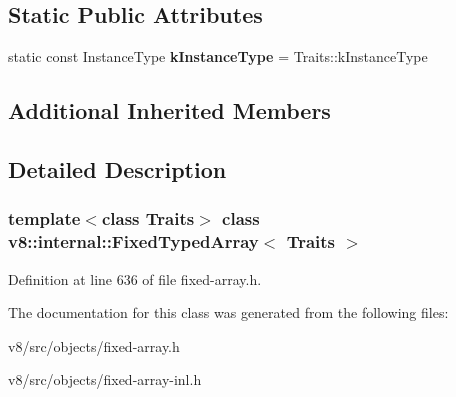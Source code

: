 \subsection*{Static Public Attributes}
\begin{DoxyCompactItemize}
\item 
\mbox{\label{classv8_1_1internal_1_1FixedTypedArray_accd010801011ae37d64c0314f264cb0b}} 
static const Instance\+Type {\bfseries k\+Instance\+Type} = Traits\+::k\+Instance\+Type
\end{DoxyCompactItemize}
\subsection*{Additional Inherited Members}


\subsection{Detailed Description}
\subsubsection*{template$<$class Traits$>$\newline
class v8\+::internal\+::\+Fixed\+Typed\+Array$<$ Traits $>$}



Definition at line 636 of file fixed-\/array.\+h.



The documentation for this class was generated from the following files\+:\begin{DoxyCompactItemize}
\item 
v8/src/objects/fixed-\/array.\+h\item 
v8/src/objects/fixed-\/array-\/inl.\+h\end{DoxyCompactItemize}
